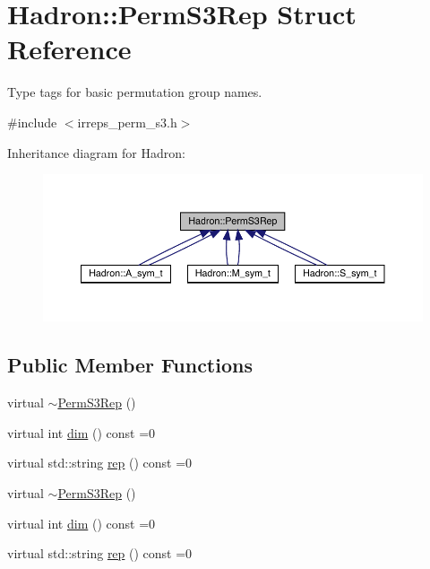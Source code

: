 \hypertarget{structHadron_1_1PermS3Rep}{}\section{Hadron\+:\+:Perm\+S3\+Rep Struct Reference}
\label{structHadron_1_1PermS3Rep}


Type tags for basic permutation group names.  




{\ttfamily \#include $<$irreps\+\_\+perm\+\_\+s3.\+h$>$}



Inheritance diagram for Hadron\+:\nopagebreak
\begin{figure}[H]
\begin{center}
\leavevmode
\includegraphics[width=350pt]{db/db1/structHadron_1_1PermS3Rep__inherit__graph}
\end{center}
\end{figure}
\subsection*{Public Member Functions}
\begin{DoxyCompactItemize}
\item 
virtual \mbox{\hyperlink{structHadron_1_1PermS3Rep_a7a804285517d8f8511b6396c6d9d9947}{$\sim$\+Perm\+S3\+Rep}} ()
\item 
virtual int \mbox{\hyperlink{structHadron_1_1PermS3Rep_a4ce8c9c9367b6120769feae38d2f5372}{dim}} () const =0
\item 
virtual std\+::string \mbox{\hyperlink{structHadron_1_1PermS3Rep_a4f22ded21fbb16c6b7dc3d729090ef4f}{rep}} () const =0
\item 
virtual \mbox{\hyperlink{structHadron_1_1PermS3Rep_a7a804285517d8f8511b6396c6d9d9947}{$\sim$\+Perm\+S3\+Rep}} ()
\item 
virtual int \mbox{\hyperlink{structHadron_1_1PermS3Rep_a4ce8c9c9367b6120769feae38d2f5372}{dim}} () const =0
\item 
virtual std\+::string \mbox{\hyperlink{structHadron_1_1PermS3Rep_a4f22ded21fbb16c6b7dc3d729090ef4f}{rep}} () const =0
\end{DoxyCompactItemize}


